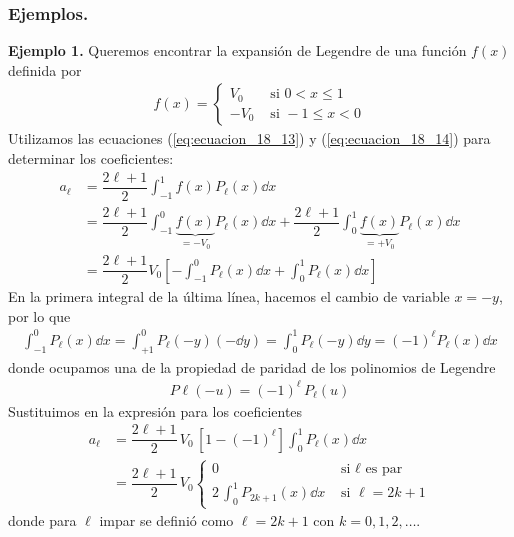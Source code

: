 \subsubsection{Ejemplos.}
\textbf{Ejemplo 1.} Queremos encontrar la expansión de Legendre de una función $f(x)$ definida por
\begin{align*}
f(x) = \begin{cases}
V_{0} & \text{ si } 0 < x \leq 1 \\
- V_{0} & \text{ si } -1 \leq x < 0
\end{cases}
\end{align*}
Utilizamos las ecuaciones (\ref{eq:ecuacion_18_13}) y (\ref{eq:ecuacion_18_14}) para determinar los coeficientes:
\begin{align*}
a_{\ell} &= \dfrac{2 \ell + 1}{2} \int_{-1}^{1} f(x) P_{\ell} (x) \dd{x} \\[1em]
&= \dfrac{2 \ell + 1}{2} \int_{-1}^{0} \underbrace{f(x)}_{=-V_0}  P_{\ell} (x) \dd{x} + \dfrac{2 \ell + 1}{2} \int_{0}^{1} \underbrace{f(x)}_{=+V_0}  P_{\ell} (x) \dd{x} \\[1em]
&= \dfrac{2 \ell + 1}{2} V_{0} \left[ - \int_{-1}^{0} P_{\ell} (x) \dd{x} + \int_{0}^{1} P_{\ell} (x) \dd{x} \right]
\end{align*}
En la primera integral de la última línea, hacemos el cambio de variable $x = -y$, por lo que
\begin{align*}
\int_{-1}^{0} P_{\ell} (x) \dd{x} = \int_{+1}^{0} P_{\ell} (-y) (-\dd{y}) = \int_{0}^{1} P_{\ell} (-y) \dd{y} = (-1)^{\ell} P_{\ell} (x) \dd{x}
\end{align*}
donde ocupamos una de la propiedad de paridad de los polinomios de Legendre
\begin{align*}
P{\ell} (-u) = (-1)^{\ell} \, P_{\ell} (u)
\end{align*}
Sustituimos en la expresión para los coeficientes
\begin{align*}
a_{\ell} &= \dfrac{2 \ell + 1}{2} \, V_{0} \,  [1 - (-1)^{\ell} ] \int_{0}^{1} P_{\ell} (x) \dd{x} \\[1em]
&= \dfrac{2 \ell + 1}{2} \, V_{0} \begin{cases}
0 & \text{ si } \ell \text{ es par} \\
\displaystyle 2  \, \int_{0}^{1} P_{2 k + 1} (x) \dd{x} & \text{ si } \ell = 2 k + 1 
\end{cases}
\end{align*}
donde para $\ell$ impar se definió como $\ell = 2 k + 1$ con $k = 0, 1, 2, \ldots$.
\par
